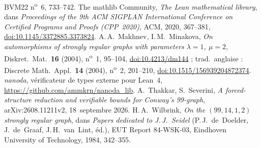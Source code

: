 \documentclass[11pt,a4paper]{article}
\theoremstyle{remark}
\begin{document}
{\begin{thebibliography}{BVM22}
n\textsuperscript{o}~6, 733--742.
 The mathlib Community, \emph{The Lean mathematical library}, dans \emph{Proceedings of the 9th ACM SIGPLAN
International Conference on Certified Programs and Proofs (CPP~2020)}, ACM, 2020, 367--381,
\href{https://doi.org/10.1145/3372885.3373824}{doi:10.1145/3372885.3373824}.
 A.\,A.~Makhnev, I.\,M.~Minakova, \emph{On automorphisms of strongly regular graphs with parameters
$\lambda=1$, $\mu=2$}, Diskret.\ Mat.\ \textbf{16} (2004), n\textsuperscript{o}~1, 95--104,
\href{https://doi.org/10.4213/dm144}{doi:10.4213/dm144} ; trad.\ anglaise : Discrete Math.\ Appl.\ \textbf{14} (2004),
n\textsuperscript{o}~2, 201--210, \href{https://doi.org/10.1515/156939204872374}{doi:10.1515/156939204872374}.
 \emph{nanoda}, vérificateur de types externe pour Lean~4, \url{https://github.com/ammkrn/nanoda_lib}.
 A.~Thakkar, S.~Severini, \emph{A forced-structure reduction and verifiable bounds for Conway's 99-graph},
arXiv:2608.11211v2, 18~septembre 2026.
 H.\,A.~Wilbrink, \emph{On the $(99,14,1,2)$ strongly regular graph}, dans \emph{Papers dedicated to
J.\,J.~Seidel} (P.\,J.~de~Doelder, J.~de~Graaf, J.\,H.~van~Lint, éd.), EUT Report 84-WSK-03, Eindhoven University of
Technology, 1984, 342--355.
\end{thebibliography}
}
\end{document}
